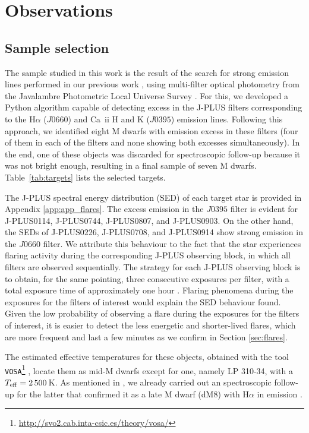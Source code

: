 

\section{Observations}\label{sec:obs}

\subsection{Sample selection}\label{sec:sample}

The sample studied in this work is the result of the search for strong emission lines performed in our previous work \citep{masbuitrago2022}, using multi-filter optical photometry from the Javalambre Photometric Local Universe Survey \citep[J-PLUS;][]{Cenarro2019}. For this, we developed a Python algorithm capable of detecting excess in the J-PLUS filters corresponding to the H$\alpha$ ($J0660$) and Ca~{\sc ii} H and K ($J0395$) emission lines. Following this approach, we identified eight M dwarfs with emission excess in these filters (four of them in each of the filters and none showing both excesses simultaneously). In the end, one of these objects was discarded for spectroscopic follow-up because it was not bright enough, resulting in a final sample of seven M dwarfs. Table~\ref{tab:targets} lists the selected targets.

The J-PLUS spectral energy distribution (SED) of each target star is provided in Appendix \ref{app:app_flares}. The excess emission in the $J0395$ filter is evident for J-PLUS0114, J-PLUS0744, J-PLUS0807, and J-PLUS0903. On the other hand, the SEDs of J-PLUS0226, J-PLUS0708, and J-PLUS0914 show strong emission in the $J0660$ filter. We attribute this behaviour to the fact that the star experiences flaring activity during the corresponding J-PLUS observing block, in which all filters are observed sequentially. The strategy for each J-PLUS observing block is to obtain, for the same pointing, three consecutive exposures per filter, with a total exposure time of approximately one hour \citep{Cenarro2019}. Flaring phenomena during the exposures for the filters of interest would explain the SED behaviour found. Given the low probability of observing a flare during the exposures for the filters of interest, it is easier to detect the less energetic and shorter-lived flares, which are more frequent and last a few minutes as we confirm in Section \ref{sec:flares}.

The estimated effective temperatures for these objects, obtained with the tool \texttt{VOSA}\footnote{\url{http://svo2.cab.inta-csic.es/theory/vosa/}} \citep{vosa}, locate them as mid-M dwarfs except for one, namely LP 310-34, with a $T_{\rm eff}=2\,500$\,K. As mentioned in \citet{masbuitrago2022}, we already carried out an spectroscopic follow-up for the latter that confirmed it as a late M dwarf (dM8) with H$\alpha$ in emission \citep{Schmidt2007}.


